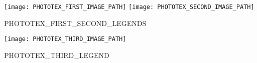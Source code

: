 \begin{minipage}[t][0.025\textheight][t]{\textwidth}
  \hfill\vfill
\end{minipage}
\begin{minipage}[t][0.45\textheight][t]{\textwidth}
  \begin{center}
    \texttt{[image: PHOTOTEX\_FIRST\_IMAGE\_PATH]}\hspace{2em}
    \texttt{[image: PHOTOTEX\_SECOND\_IMAGE\_PATH]}\\[1em]
  \end{center}
\end{minipage}
\begin{minipage}[t][0.03\textheight][t]{\textwidth}
  \begin{center}
    PHOTOTEX_FIRST_SECOND_LEGENDS\\[1em]
  \end{center}
\end{minipage}
\begin{minipage}[t][0.45\textheight][t]{\textwidth}
  \begin{center}
    \texttt{[image: PHOTOTEX\_THIRD\_IMAGE\_PATH]}\\[1em]
  \end{center}
\end{minipage}
\begin{minipage}[t][0.03\textheight][t]{\textwidth}
  \begin{center}
    PHOTOTEX_THIRD_LEGEND\\[1em]
  \end{center}
\end{minipage}

\clearpage
